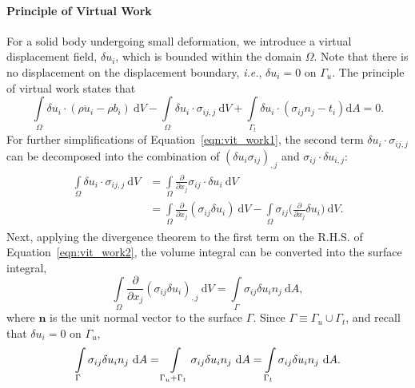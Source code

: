 \documentclass[12pt, a4paper]{article}
\numberwithin{equation}{section}
\begin{document}
\paragraph{Principle of Virtual Work} 
For a solid body undergoing small deformation, we introduce a virtual displacement field, $\delta u_i$, which is bounded within the domain $\Omega$. Note that there is no displacement on the displacement boundary, \textit{i.e.}, $\delta u_i = 0$ on $\Gamma_u$. The principle of virtual work states that 
\begin{equation}
\label{eqn:vit_work1}
    \int \limits_\Omega \delta u_i \cdot (\rho \ddot{u}_i - \rho b_i) \ \mathrm{d}V - 
    \int \limits_\Omega \delta u_i \cdot \sigma_{ij, j} \  \mathrm{d}V
    + \int \limits_{\Gamma_t} \delta u_i \cdot(\sigma_{ij} n_j - t_i) \mathrm{d}A = 0.
\end{equation}
For further simplifications of Equation~\ref{eqn:vit_work1}, the second term $\delta u_i \cdot \sigma_{ij, j}$ can be decomposed into the combination of $(\delta u_i \sigma_{ij})_{,j}$ and $\sigma_{ij} \cdot \delta u_{i,j}$:
\begin{align}
\begin{split}
\label{eqn:vit_work2}
    \int \limits_\Omega  \delta u_i \cdot \sigma_{ij, j} \ \mathrm{d}V
    & = \int \limits_\Omega \frac{\partial}{\partial x_j} \sigma_{ij} \cdot \delta u_i \ \mathrm{d}V \\
    & = \int \limits_\Omega \frac{\partial}{\partial x_j} (\sigma_{ij} \delta u_i) \ \mathrm{d}V - \int \limits_\Omega \sigma_{ij} \bigg(\frac{\partial}{\partial x_j} \delta u_i \bigg) \ \mathrm{d}V.
\end{split}
\end{align}
Next, applying the divergence theorem to the first term on the R.H.S. of Equation~\ref{eqn:vit_work2}, the volume integral can be converted into the surface integral,
\begin{equation}
\label{eqn:vit_work3}
    \int \limits_\Omega \frac{\partial}{\partial x_j} (\sigma_{ij} \delta u_i)_{, j} \ \mathrm{d}V = \int \limits_\Gamma \sigma_{ij} \delta u_i n_j \ \mathrm{d}A , 
\end{equation}
where $\mathbf{n}$ is the unit normal vector to the surface $\Gamma$. Since $\Gamma \equiv \Gamma_u \cup \Gamma_t$, and recall that $\delta u_i = 0$ on $\Gamma_u$,
\begin{equation}
\label{eqn:vit_work4}
    \int \limits_\Gamma \sigma_{ij} \delta u_i n_j \ \mathrm{d} A
    = \int \limits_{\Gamma_u + \Gamma_t} \sigma_{ij} \delta u_i n_j \ \mathrm{d} A \\
    = \int \limits_{\Gamma_t} \sigma_{ij} \delta u_i n_j \ \mathrm{d} A.
\end{equation}
\end{document}
